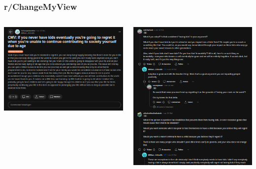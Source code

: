 \documentclass[compress,12pt]{beamer}
\begin{document}
    \begin{frame}[plain]
        \frametitle{r/ChangeMyView}
        \begin{columns}
            \begin{column}{0.5\textwidth}
                \includegraphics[width=\columnwidth]{../images/cmv-example-op}
            \end{column}
            \begin{column}{0.5\textwidth}
                \includegraphics[width=\columnwidth]{../images/cmv-example-thread}
            \end{column}
        \end{columns}
    \end{frame}
\end{document}

